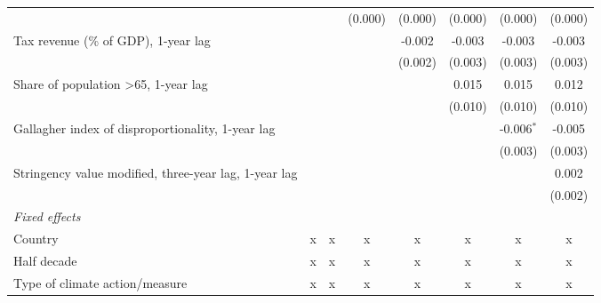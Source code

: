 \begin{tabular}{lccccccc}
                                                                                 &              &              & (0.000)       & (0.000)      & (0.000)        & (0.000)        & (0.000)\\   
   Tax revenue (\% of GDP), 1-year lag                                           &              &              &               & -0.002       & -0.003         & -0.003         & -0.003\\   
                                                                                 &              &              &               & (0.002)      & (0.003)        & (0.003)        & (0.003)\\   
   Share of population >65, 1-year lag                                           &              &              &               &              & 0.015          & 0.015          & 0.012\\   
                                                                                 &              &              &               &              & (0.010)        & (0.010)        & (0.010)\\   
   Gallagher index of disproportionality, 1-year lag                             &              &              &               &              &                & -0.006$^{*}$   & -0.005\\   
                                                                                 &              &              &               &              &                & (0.003)        & (0.003)\\   
   Stringency value modified, three-year lag, 1-year lag                         &              &              &               &              &                &                & 0.002\\   
                                                                                 &              &              &               &              &                &                & (0.002)\\   
   \emph{Fixed effects}\\
   Country                                                                       & x            & x            & x             & x            & x              & x              & x\\  
   Half decade                                                                   & x            & x            & x             & x            & x              & x              & x\\  
   Type of climate action/measure                                                & x            & x            & x             & x            & x              & x              & x\\  

\end{tabular}
